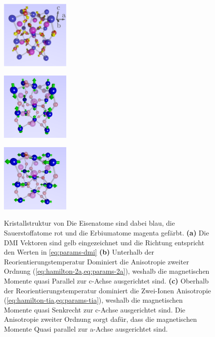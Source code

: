 \documentclass[main.tex]{subfiles}
\begin{document}
\begin{figure}[htbp]
	\centering

	{\includegraphics[width=0.3\textwidth]{bilder/jschlege/UnitCell_withDMI_labeled.png}}

	{\includegraphics[width=0.3\textwidth]{bilder/jschlege/UnitCell_belowRT.png}}

	{\includegraphics[width=0.3\textwidth]{bilder/jschlege/UnitCell_aboveRT.png}}
	\caption{Kristallstruktur von   Die Eisenatome sind dabei
		blau, die Sauerstoffatome rot und die Erbiumatome magenta
		gefärbt.
		\textbf{(a)} Die DMI Vektoren sind gelb eingezeichnet und die
		Richtung
		entspricht den Werten in \cref{eq:params-dmi}
		\textbf{(b)} Unterhalb der Reorientierungstemperatur Dominiert
		die
		Anisotropie zweiter Ordnung
		(\cref{eq:hamilton-2a,eq:params-2a}), weshalb die
		magnetischen Momente quasi Parallel zur c-Achse ausgerichtet
		sind.
		\textbf{(c)} Oberhalb der Reorientierungstemperatur dominiert
		die
		Zwei-Ionen Anisotropie (\cref{eq:hamilton-tia,eq:params-tia}),
		weshalb die
		magnetischen Momente quasi Senkrecht zur c-Achse ausgerichtet
		sind. Die
		Anisotropie zweiter Ordnung sorgt dafür, dass die magnetischen
		Momente Quasi
		parallel zur a-Achse ausgerichtet sind. \cite{schlegel-master}}
	\label{fig:orthoferrit}
\end{figure}
\end{document}
